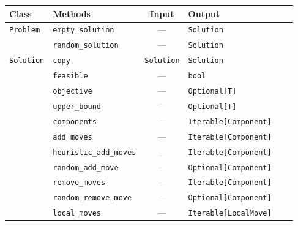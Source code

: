 \renewcommand{\arraystretch}{1.5}
\begin{adjustbox}{max width=\textwidth}
  \begin{tabular}{@{}llcp{4cm}cp{4cm}@{}}
    \toprule
    \textbf{Class}                      & \textbf{Methods}                         & \textbf{Input}     & \textbf{Output}              \\
    \midrule
    \multirow{2}{*}{\texttt{Problem}}   & \texttt{empty\_solution}                 & ---                & \texttt{Solution}            \\
                                        & \texttt{random\_solution}                & ---                & \texttt{Solution}            \\
    \midrule
    \multirow{23}{*}{\texttt{Solution}} & \texttt{copy}                            & \texttt{Solution}  & \texttt{Solution}            \\
                                        & \texttt{feasible}                        & ---                & \texttt{bool}                \\
                                        & \texttt{objective}                       & ---                & \texttt{Optional[T]}         \\
                                        & \texttt{upper\_bound}                    & ---                & \texttt{Optional[T]}         \\
                                        & \texttt{components}                      & ---                & \texttt{Iterable[Component]} \\
                                        & \texttt{add\_moves}                      & ---                & \texttt{Iterable[Component]} \\
                                        & \texttt{heuristic\_add\_moves}           & ---                & \texttt{Iterable[Component]} \\
                                        & \texttt{random\_add\_move}               & ---                & \texttt{Optional[Component]} \\
                                        & \texttt{remove\_moves}                   & ---                & \texttt{Iterable[Component]} \\
                                        & \texttt{random\_remove\_move}            & ---                & \texttt{Optional[Component]} \\
                                        & \texttt{local\_moves}                    & ---                & \texttt{Iterable[LocalMove]} \\

\end{tabular}
\end{adjustbox}
